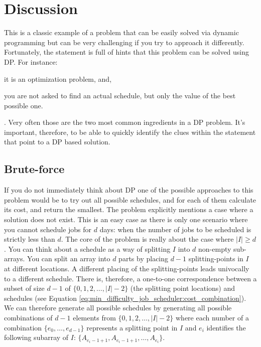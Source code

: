 \section{Discussion}
\label{min_difficulty_job_scheduler:sec:discussion}
This is a classic example of a problem that can be easily solved via dynamic programming
but can be very challenging if you try to approach it differently. Fortunately, the statement is
full of hints that this problem can be solved using DP. For instance:
\begin{enumerate*}
    \item it is an optimization problem, and,
    \item you are not asked to find an actual schedule, but only the value of the best possible one.
\end{enumerate*}. Very often those are the two most common ingredients in a DP problem. It's important, therefore, to be able to quickly identify the clues within the statement that point to a DP based solution. 




\subsection{Brute-force}
\label{min_difficulty_job_scheduler:sec:bruteforce}
If you do not immediately think about DP one of the possible approaches to this problem would
be to try out all possible schedules, and for each of them calculate its cost, and return the
smallest. The problem explicitly mentions a case where a solution does not exist. This is an easy
case as there is only one scenario where you cannot schedule jobs for $d$ days: when the number of
jobs to be scheduled is strictly less than $d$. The core of the problem is really about the case
where $|I| \geq d$. You can think about a schedule as a way of splitting $I$ into $d$ non-empty
sub-arrays. You can split an array into $d$ parts by placing $d-1$ splitting-points in $I$ at
different locations. A different placing of the splitting-points leads univocally to a different
schedule. There is, therefore, a one-to-one correspondence between a subset of size $d-1$ of
$\{0,1,2, \ldots, |I|-2\}$ (the splitting point locations) and schedules (see Equation
\ref{eq:min_difficulty_job_scheduler:cost_combination}). We can therefore generate all possible
schedules by generating all possible combinations of $d-1$ elements from $\{0,1,2, \ldots, |I|-2\}$
where each number of a combination  $\{e_0, \ldots, e_{d-1}\}$ represents a splitting point in $I$
and $e_i$ identifies the following subarray of $I$: $\{A_{e_i-1+1}, A_{e_i-1+1}, \ldots ,
A_{e_i}\}$.

